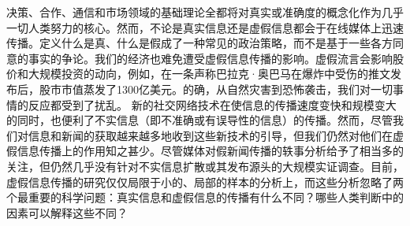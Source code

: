 \documentclass[a4paper,AutoFakeBold,oneside,12pt]{book}
\begin{document}
\songti{}
决策、合作、通信和市场领域的基础理论全都将对真实或准确度的概念化作为几乎一切人类努力的核心。然而，不论是真实信息还是虚假信息都会于在线媒体上迅速传播。定义什么是真、什么是假成了一种常见的政治策略，而不是基于一些各方同意的事实的争论。我们的经济也难免遭受虚假信息传播的影响。虚假流言会影响股价和大规模投资的动向，例如，在一条声称巴拉克·奥巴马在爆炸中受伤的推文发布后，股市市值蒸发了1300亿美元。的确，从自然灾害到恐怖袭击，我们对一切事情的反应都受到了扰乱。
新的社交网络技术在使信息的传播速度变快和规模变大的同时，也便利了不实信息（即不准确或有误导性的信息）的传播。然而，尽管我们对信息和新闻的获取越来越多地收到这些新技术的引导，但我们仍然对他们在虚假信息传播上的作用知之甚少。尽管媒体对假新闻传播的轶事分析给予了相当多的关注，但仍然几乎没有针对不实信息扩散或其发布源头的大规模实证调查。目前，虚假信息传播的研究仅仅局限于小的、局部的样本的分析上，而这些分析忽略了两个最重要的科学问题：真实信息和虚假信息的传播有什么不同？哪些人类判断中的因素可以解释这些不同？

\thispagestyle{empty}
\begin{center}


\end{center}

 


 
\end{document}
